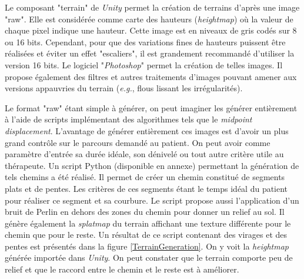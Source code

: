		Le composant "terrain" de \textit{Unity} permet la création de terrains d'après une image "raw". Elle est considérée comme carte des hauteurs (\textit{heightmap}) où la valeur de chaque pixel indique une hauteur. Cette image est en niveaux de gris codés sur 8 ou 16 bits. Cependant, pour que des variations fines de hauteurs puissent être réalisées et éviter un effet "escaliers", il est grandement recommandé d'utiliser la version 16 bits. Le logiciel "\textit{Photoshop}" \cite{Photoshop_website} permet la création de telles images. Il propose également des filtres et autres traitements d'images pouvant amener aux versions appauvries du terrain (\textit{e.g.}, flous lissant les irrégularités).
		
		Le format "raw" étant simple à générer, on peut imaginer les générer entièrement à l'aide de scripts implémentant des algorithmes tels que le \textit{midpoint displacement}. L'avantage de générer entièrement ces images est d'avoir un plus grand contrôle sur le parcours demandé au patient. On peut avoir comme paramètre d'entrée sa durée idéale, son dénivelé ou tout autre critère utile au thérapeute. Un script Python \cite{python_website} (disponible en annexe) permettant la génération de tels chemins a été réalisé. Il permet de créer un chemin constitué de segments plats et de pentes. Les critères de ces segments étant le temps idéal du patient pour réaliser ce segment et sa courbure. Le script propose aussi l'application d'un bruit de Perlin en dehors des zones du chemin pour donner un relief au sol. Il génère également la \textit{splatmap} du terrain affichant une texture différente pour le chemin que pour le reste. Un résultat de ce script contenant des virages et des pentes est présentés dans la figure \ref{TerrainGeneration}. On y voit la \textit{heightmap} générée importée dans \textit{Unity}. On peut constater que le terrain comporte peu de relief et que le raccord entre le chemin et le reste est à améliorer.
		\medskip
		

